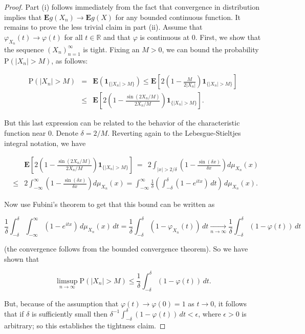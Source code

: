 \documentclass[11pt]{report}
\newcommand{\R}{\mathbb{R}}
\theoremstyle{plain}
\theoremstyle{definition}
\begin{document}
\begin{proof}
Part (i) follows immediately from the fact that
convergence in distribution implies that
$\mathbf{E} g(X_n)\to \mathbf{E} g(X)$ for any
bounded continuous function. It remains to prove the
less trivial claim in part (ii). Assume that
$\varphi_{X_n}(t)\to \varphi(t)$ for all $t\in\R$ and
that $\varphi$ is continuous at $0$. First, we show
that the sequence $(X_n)_{n=1}^\infty$ is tight.
Fixing an $M>0$, we can bound the probability
$\mathrm{P}(|X_n|>M)$, as follows:

\begin{eqnarray*} \mathrm{P}(|X_n|>M) &=& \mathbf{E}\left( \mathbf{1}_{\{|X_n|>M\}}\right) \le
\mathbf{E} \left[ 2 \left( 1-\frac{M}{2|X_n|} \right) \mathbf{1}_{\{|X_n|>M\}}\right] \\
&\le&
\mathbf{E} \left[ 2 \left( 1-\frac{\sin(2X_n/M)}{2X_n/M} \right) \mathbf{1}_{\{|X_n|>M\}}\right].
\end{eqnarray*}

But this last expression can be related to the
behavior of the characteristic function near $0$.
Denote $\delta=2/M$. Reverting again to the
Lebesgue-Stieltjes integral notation, we have

\begin{eqnarray*}
&&\mathbf{E} \left[ 2 \left( 1-\frac{\sin(2X_n/M)}{2X_n/M} \right) \mathbf{1}_{\{|X_n|>M\}}\right]
 \ =\ \  2\int_{|x|>2/\delta} \left(1-\frac{\sin (\delta x)}{\delta x}\right) d\mu_{X_n}(x) \\
&\le& 2\int_{-\infty}^\infty \left(1-\frac{\sin (\delta x)}{\delta x}\right) d\mu_{X_n}(x)
= \int_{-\infty}^\infty \frac{1}{\delta}\left(\int_{-\delta}^\delta (1-e^{itx})\,dt\right)\,d\mu_{X_n}(x).
\end{eqnarray*}

Now use Fubini's theorem to get that this bound can
be written as

\[
\frac{1}{\delta} \int_{-\delta}^\delta \int_{-\infty}^\infty (1-e^{itx})\,d\mu_{X_n}(x)\,dt
=\frac{1}{\delta} \int_{-\delta}^\delta (1-\varphi_{X_n}(t))\,dt
\xrightarrow[n\to\infty]{} \frac{1}{\delta} \int_{-\delta}^\delta (1-\varphi(t))\,dt
\]

(the convergence follows from the bounded
convergence theorem). So we have shown that

\[
\limsup_{n\to\infty} \mathrm{P}(|X_n|>M) \le \frac{1}{\delta} \int_{-\delta}^\delta (1-\varphi(t))\,dt.
\]

But, because of the assumption that
$\varphi(t)\to \varphi(0)=1$ as $t\to 0$, it follows
that if $\delta$ is sufficiently small then
$\delta^{-1} \int_{-\delta}^\delta (1-\varphi(t))\,dt
< \epsilon$,
where $\epsilon>0$ is arbitrary; so this establishes
the tightness claim.


\end{proof}
\end{document}
